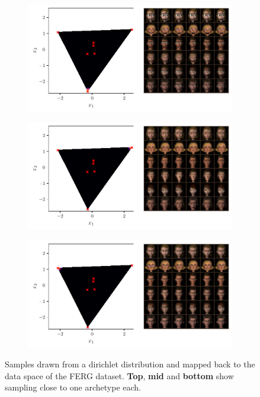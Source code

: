 \begin{figure}[htpb]
	\centering
	\begin{subfigure}[htpb]{\textwidth}
		\centering
		\includegraphics[width=1\linewidth]{figures/samples/aa_ferg1.pdf}
	\end{subfigure}

	\begin{subfigure}[htpb]{\textwidth}
		\centering
		\includegraphics[width=1\linewidth]{figures/samples/aa_ferg2.pdf}
	\end{subfigure}

	\begin{subfigure}[htpb]{\textwidth}
		\centering
		\includegraphics[width=1\linewidth]{figures/samples/aa_ferg3.pdf}
	\end{subfigure}

	\caption{Samples drawn from a dirichlet distribution and mapped back to
		the data space of the FERG dataset. \textbf{Top}, \textbf{mid}
                and \textbf{bottom} show
		sampling close to one archetype each.}%
	\label{fig:aa_ferg_corners}
\end{figure}

